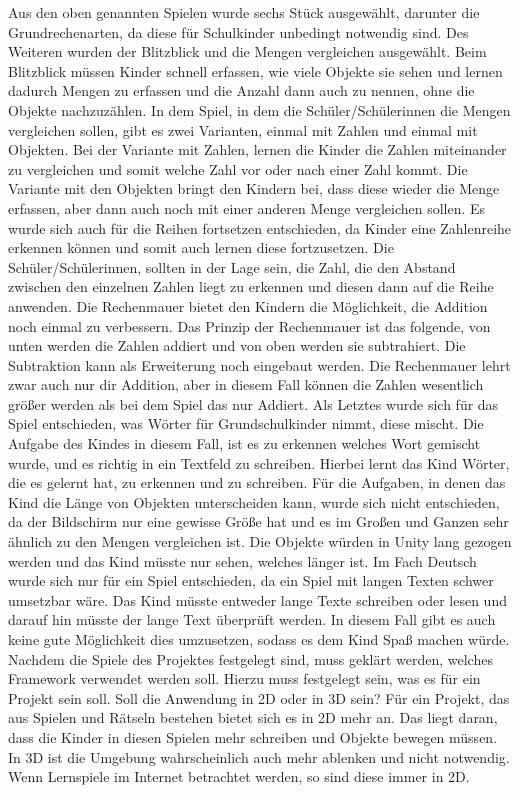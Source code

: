 Aus den oben genannten Spielen wurde sechs Stück ausgewählt, darunter die Grundrechenarten, da diese für Schulkinder unbedingt notwendig sind. Des Weiteren wurden der Blitzblick und die Mengen vergleichen ausgewählt. Beim Blitzblick müssen Kinder schnell erfassen, wie viele Objekte sie sehen und lernen dadurch Mengen zu erfassen und die Anzahl dann auch zu nennen, ohne die Objekte nachzuzählen. In dem Spiel, in dem die Schüler/Schülerinnen die Mengen vergleichen sollen, gibt es zwei Varianten, einmal mit Zahlen und einmal mit Objekten. Bei der Variante mit Zahlen, lernen die Kinder die Zahlen miteinander zu vergleichen und somit welche Zahl vor oder nach einer Zahl kommt. Die Variante mit den Objekten bringt den Kindern bei, dass diese wieder die Menge erfassen, aber dann auch noch mit einer anderen Menge vergleichen sollen. Es wurde sich auch für die Reihen fortsetzen entschieden, da Kinder eine Zahlenreihe erkennen können und somit auch lernen diese fortzusetzen. Die Schüler/Schülerinnen, sollten in der Lage sein, die Zahl, die den Abstand zwischen den einzelnen Zahlen liegt zu erkennen und diesen dann auf die Reihe anwenden. Die Rechenmauer bietet den Kindern die Möglichkeit, die Addition noch einmal zu verbessern. Das Prinzip der Rechenmauer ist das folgende, von unten werden die Zahlen addiert und von oben werden sie subtrahiert. Die Subtraktion kann als Erweiterung noch eingebaut werden. Die Rechenmauer lehrt zwar auch nur dir Addition, aber in diesem Fall können die Zahlen wesentlich größer werden als bei dem Spiel das nur Addiert. Als Letztes wurde sich für das Spiel entschieden, was Wörter für Grundschulkinder nimmt, diese mischt. Die Aufgabe des Kindes in diesem Fall, ist es zu erkennen welches Wort gemischt wurde, und es richtig in ein Textfeld zu schreiben. Hierbei lernt das Kind Wörter, die es gelernt hat, zu erkennen und zu schreiben. Für die Aufgaben, in denen das Kind die Länge von Objekten unterscheiden kann, wurde sich nicht entschieden, da der Bildschirm nur eine gewisse Größe hat und es im Großen und Ganzen sehr ähnlich zu den Mengen vergleichen ist. Die Objekte würden in Unity lang gezogen werden und das Kind müsste nur sehen, welches länger ist. Im Fach Deutsch wurde sich nur für ein Spiel entschieden, da ein Spiel mit langen Texten schwer umsetzbar wäre. Das Kind müsste entweder lange Texte schreiben oder lesen und darauf hin müsste der lange Text überprüft werden. In diesem Fall gibt es auch keine gute Möglichkeit dies umzusetzen, sodass es dem Kind Spaß machen würde.
\\
Nachdem die Spiele des Projektes festgelegt sind, muss geklärt werden, welches Framework verwendet werden soll. Hierzu muss festgelegt sein, was es für ein Projekt sein soll. Soll die Anwendung in 2D oder in 3D sein? Für ein Projekt, das aus Spielen und Rätseln bestehen bietet sich es in 2D mehr an. Das liegt daran, dass die Kinder in diesen Spielen mehr schreiben und Objekte bewegen müssen. In 3D ist die Umgebung wahrscheinlich auch mehr ablenken und nicht notwendig. Wenn Lernspiele im Internet betrachtet werden, so sind diese immer in 2D.\\
